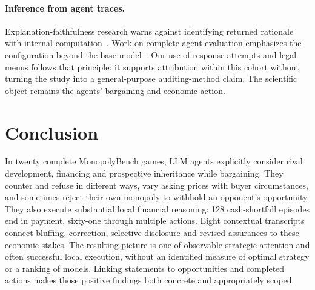 \paragraph{Inference from agent traces.}
Explanation-faithfulness research warns against identifying returned rationale with internal computation~\cite{turpin2023unfaithful,lanham2023faithfulness}. Work on complete agent evaluation emphasizes the configuration beyond the base model~\cite{kapoor2026hal,zhang2026dece}. Our use of response attempts and legal menus follows that principle: it supports attribution within this cohort without turning the study into a general-purpose auditing-method claim. The scientific object remains the agents' bargaining and economic action.

\section{Conclusion}

In twenty complete MonopolyBench games, LLM agents explicitly consider rival development, financing and prospective inheritance while bargaining. They counter and refuse in different ways, vary asking prices with buyer circumstances, and sometimes reject their own monopoly to withhold an opponent's opportunity. They also execute substantial local financial reasoning: 128 cash-shortfall episodes end in payment, sixty-one through multiple actions. Eight contextual transcripts connect bluffing, correction, selective disclosure and revised assurances to these economic stakes. The resulting picture is one of observable strategic attention and often successful local execution, without an identified measure of optimal strategy or a ranking of models. Linking statements to opportunities and completed actions makes those positive findings both concrete and appropriately scoped.
